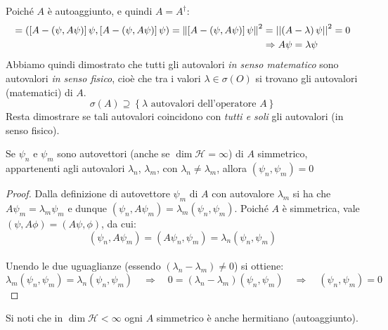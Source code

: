 Poiché $A$ è autoaggiunto, e quindi $A=A^\dag$:
\begin{align}
\nonumber =\left(\left[A-\left(\psi,A\psi\right)\right]\psi,\left[A-\left(\psi,A\psi\right)\right]\psi\right)=\left\lVert\left[A-\left(\psi,A\psi\right)\right]\psi\right\rVert^2&=\left|\left|\left(A-\lambda\right)\psi\right|\right|^2 = 0\\
\label{eqn:fluttuazione-autoaggiunto}
 &\Rightarrow A\psi=\lambda\psi
\end{align}
Abbiamo quindi dimostrato che tutti gli autovalori \textit{in senso matematico} sono autovalori \textit{in senso fisico}, cioè che tra i valori $\lambda \in \sigma \left(O\right)$ si trovano gli autovalori (matematici) di $A$.
\[
\sigma\left(A\right)\supseteq\left\{\lambda\text{ autovalori dell'operatore } A\right\}
\]
Resta dimostrare se tali autovalori  coincidono con \textit{tutti e soli} gli autovalori (in senso fisico).\\

\begin{thm}
Se $\psi_n$ e $\psi_m$ sono autovettori (anche se $\dim{\mathcal{H}=\infty}$) di $A$ simmetrico, appartenenti agli autovalori $\lambda_n$, $\lambda_m$, con $\lambda_n\neq \lambda_m$, allora $\left(\psi_n, \psi_m\right)=0$
\end{thm}
\begin{proof} Dalla definizione di autovettore $\psi_m$ di $A$ con autovalore $\lambda_m$ si ha che $A\psi_m = \lambda_m \psi_m$ e dunque $\left(\psi_n, A\psi_m\right)=\lambda_m\left(\psi_n, \psi_m\right)$.
Poiché $A$ è simmetrica, vale $(\psi, A \phi) = (A \psi, \phi)$, da cui:
\[ (\psi_n, A\psi_m) = (A\psi_n, \psi_m) = \lambda_n (\psi_n, \psi_m)\]\\
Unendo le due uguaglianze (essendo $\left(\lambda_n-\lambda_m\right)\neq 0$) si ottiene:
\[
\lambda_m (\psi_n, \psi_m) = \lambda_n (\psi_n, \psi_m) \quad \Rightarrow \quad 0 = (\lambda_n -\lambda_m)(\psi_n, \psi_m) \quad \Rightarrow \quad (\psi_n, \psi_m) = 0
\]
\end{proof}

Si noti che in $\dim{\mathcal{H}<\infty}$ ogni $A$ simmetrico è anche hermitiano (autoaggiunto).\\ %

